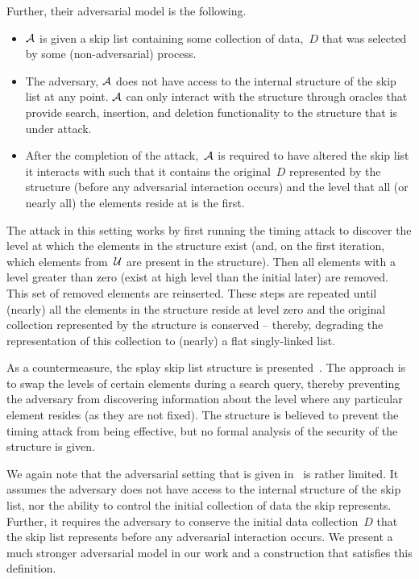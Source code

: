 Further, their adversarial model is the following. 

\begin{itemize}
    \item $\mathcal{A}$ is given a skip list containing some collection of data,~$D$ that was selected by some (non-adversarial) process. 
    \item The adversary, $\mathcal{A}$ does not have access to the internal structure of the skip list at any point. $\mathcal{A}$ can only interact with the structure through oracles that provide search, insertion, and deletion functionality to the structure that is under attack.
    \item After the completion of the attack,~$\mathcal{A}$ is required to have altered the skip list it interacts with such that it contains the original~$D$ represented by the structure (before any adversarial interaction occurs) and the level that all (or nearly all) the elements reside at is the first.  
\end{itemize}

The attack in this setting works by first running the timing attack to discover the level at which the elements in the structure exist (and, on the first iteration, which elements from~$\mathcal{U}$ are present in the structure). Then all elements with a level greater than zero (exist at high level than the initial later) are removed. This set of removed elements are reinserted. These steps are repeated until (nearly) all the elements in the structure reside at level zero and the original collection represented by the structure is conserved -- thereby, degrading the representation of this collection to (nearly) a flat singly-linked list. 

As a countermeasure, the splay skip list structure is presented~\cite{nussbaum2019skiplist}.  The approach is to swap the levels of certain elements during a search query, thereby preventing the adversary from discovering information about the level where any particular element resides (as they are not fixed). The structure is believed to prevent the timing attack from being effective, but no formal analysis of the security of the structure is given. 

We again note that the adversarial setting that is given in~\cite{nussbaum2019skiplist} is rather limited. It assumes the adversary does not have access to the internal structure of the skip list, nor the ability to control the initial collection of data the skip represents. Further, it requires the adversary to conserve the initial data collection~$D$ that the skip list represents before any adversarial interaction occurs. We present a much stronger adversarial model in our work and a construction that satisfies this definition.

